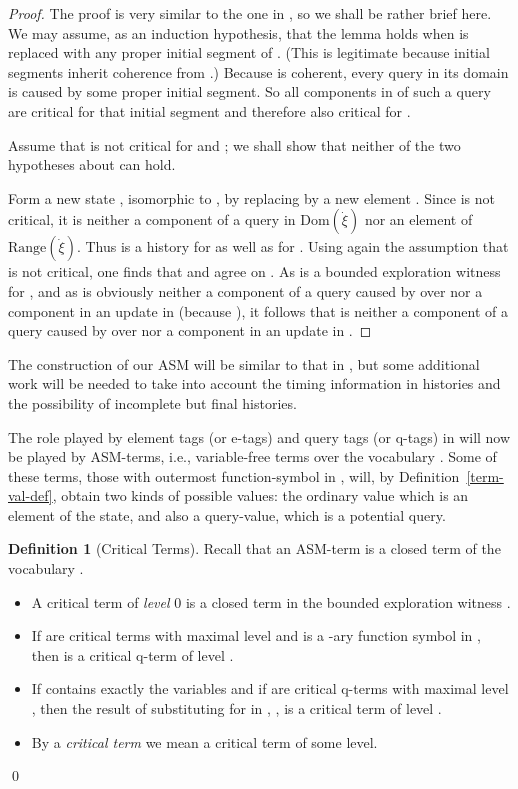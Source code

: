 \documentclass{LMCS}
\theoremstyle{definition}
\newtheorem{df}[thm]{Definition}
\newenvironment{ls}{\begin{itemize}}{\end{itemize}}
\newcommand{\ans}{\dot}
\newcommand{\dom}[1]{\ensuremath{{\text{Dom}}(#1)}}
\newcommand{\ran}[1]{\ensuremath{{\text{Range}}(#1)}}
\begin{document}
\begin{proof}
The proof is very similar to the one in \cite[Propositions~5.23 and
5.24]{oa1}, so we shall be rather brief here.
We may assume, as an
induction hypothesis, that the lemma holds when  is replaced with
any proper initial segment of .  (This is legitimate because
initial segments inherit coherence from .)
Because  is coherent, every query in its domain is caused by
some proper initial segment.  So all components in  of such a query
are critical for that initial segment and therefore also critical for
.

Assume that  is not critical for  and ; we shall show that
neither of the two hypotheses about  can hold.

Form a new state , isomorphic to , by replacing  by a new
element .  Since  is not critical, it is neither a component of
a query in \dom{\ans\xi} nor an element of \ran{\ans\xi}.  Thus  is a
history for  as well as for .  Using again the assumption that
 is not critical, one finds that  and  agree on
.  As  is a bounded exploration witness for , and as  is
obviously neither a component of a query caused by  over  nor
a component in an update in  (because ), it
follows that  is neither a component of a query caused by 
over  nor a component in an update in .
\end{proof}

The construction of our ASM will be similar to that in
\cite[Section~5]{oa3}, but some additional work will be needed to
take into account the timing information in histories and the
possibility of incomplete but final histories.

The role played by element tags (or e-tags) and query tags (or q-tags)
in \cite{oa3} will now be played by ASM-terms, i.e., variable-free
terms over the vocabulary . Some of these terms, those
with outermost function-symbol in , will, by
Definition~\ref{term-val-def}, obtain two kinds of possible values:
the ordinary value which is an element of the state, and also a
query-value, which is a potential query.

\begin{df}[Critical Terms] Recall that an ASM-term is a
  closed term of the vocabulary .
  \begin{ls}
    \item A critical  term of \emph{level} 0 is a closed term in the
    bounded exploration witness .
    \item If  are critical terms with maximal level
     and  is a -ary function symbol in , then
     is a critical q-term of level .
    \item If  contains exactly the variables 
    and if  are critical q-terms with maximal level ,
    then the result of substituting  for  in , , is a critical term of level .
    \item By a \emph{critical  term} we mean a critical  term of some level.
  \end{ls}
\qed\end{df}
\end{document}
